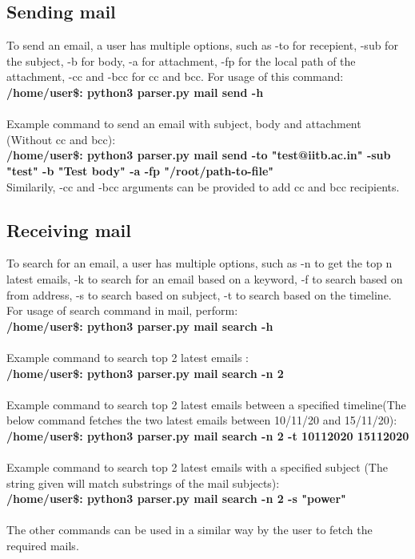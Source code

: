 \documentclass[12pt, letterpaper, twoside]{article}
\begin{document}
\subsection{Sending mail}
To send an email, a user has multiple options, such as -to for recepient, -sub for the subject, -b for body, -a for attachment, -fp for the local path of the attachment, -cc and -bcc for cc and bcc. For usage of this command: \\
\textbf{/home/user\$: python3 parser.py mail send -h}\\
\\
Example command to send an email with subject, body and attachment (Without cc and bcc):\\
\textbf{/home/user\$: python3 parser.py mail send -to "test@iitb.ac.in" -sub "test" -b "Test body" -a -fp "/root/path-to-file"}\\
Similarily, -cc and -bcc arguments can be provided to add cc and bcc recipients.

\subsection{Receiving mail}
To search for an email, a user has multiple options, such as -n to get the top n latest emails, -k to search for an email based on a keyword, -f to search based on from address, -s to search based on subject, -t to search based on the timeline.
For usage of search command in mail, perform:\\
\textbf{/home/user\$: python3 parser.py mail search -h}\\
\\
Example command to search top 2 latest emails :\\
\textbf{/home/user\$: python3 parser.py mail search -n 2}\\
\\
Example command to search top 2 latest emails between a specified timeline(The below command fetches the two latest emails between 10/11/20 and 15/11/20):\\
\textbf{/home/user\$: python3 parser.py mail search -n 2 -t 10112020 15112020}\\
\\
Example command to search top 2 latest emails with a specified subject (The string given will match substrings of the mail subjects):\\
\textbf{/home/user\$: python3 parser.py mail search -n 2 -s "power"}\\
\\
The other commands can be used in a similar way by the user to fetch the required mails.
\end{document}
